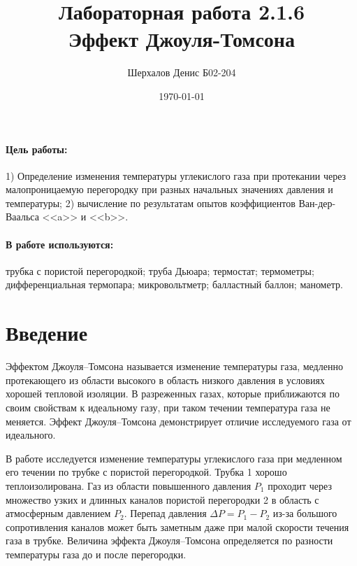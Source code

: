 \documentclass[a4paper,12pt]{article}
\author{Шерхалов Денис Б02-204}
\title{Лабораторная работа 2.1.6 \\
	\textbf{Эффект Джоуля-Томсона}}
\date{\today}
\begin{document}
	
	{\Large \maketitle}

	\paragraph*{Цель работы:} 1) Определение изменения температуры углекислого газа при протекании через малопроницаемую перегородку при разных начальных значениях давления и температуры; 2) вычисление по результатам опытов коэффициентов Ван-дер-Ваальса <<a>> и <<b>>.
	
	\paragraph*{В работе используются:} трубка с пористой перегородкой; труба Дьюара; термостат; термометры; дифференциальная термопара; микровольтметр; балластный баллон; манометр.
	
	\section{Введение}
	Эффектом Джоуля–Томсона называется изменение температуры газа, медленно протекающего из области высокого в область низкого давления в условиях хорошей тепловой изоляции. В разреженных газах, которые приближаются по своим свойствам к идеальному газу, при таком течении температура газа не меняется. Эффект Джоуля–Томсона демонстрирует отличие исследуемого газа от идеального.
	
	В работе исследуется изменение температуры углекислого газа при медленном его течении по трубке с пористой перегородкой. Трубка 1 хорошо теплоизолирована. Газ из области повышенного давления $P_1$ проходит через множество узких и длинных каналов пористой перегородки 2 в область с атмосферным давлением $P_2$. Перепад давления  $\Delta P = P_1 - P_2$ из-за большого сопротивления каналов может быть заметным даже при малой скорости течения газа в трубке. Величина эффекта Джоуля–Томсона определяется по разности температуры газа до и после перегородки.
	
\end{document}
